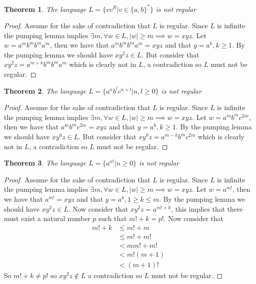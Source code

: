 \documentclass[11pt]{exam}
\newtheorem{theorem}{Theorem}[section]
\begin{document}
\begin{theorem}
The language $L = \{vv^R | v \in \{a,b\}^* \}$ is not regular
\end{theorem}

\begin{proof}
Assume for the sake of contradiction that $L$ is regular. Since $L$ is infinite the pumping lemma implies $\exists m, \forall w \in L, |w| \geq m \implies w = xyz$. Let $w = a^mb^mb^ma^m$, then we have that $a^mb^mb^ma^m = xyz$ and that $y = a^k, k \geq 1$. By the pumping lemma we should have $xy^2z \in L$. But consider that $xy^2z = a^{m+k}b^mb^ma^m$ which is clearly not in $L$, a contradiction so $L$ must not be regular.
\end{proof}


\begin{theorem}
The language $L = \{a^nb^lc^{n+l} | n,l \geq 0\}$ is not regular
\end{theorem}

\begin{proof}
Assume for the sake of contradiction that $L$ is regular. Since $L$ is infinite the pumping lemma implies $\exists m, \forall w \in L, |w| \geq m \implies w = xyz$. Let $w = a^mb^mc^{2m}$, then we have that $a^mb^mc^{2m} = xyz$ and that $y = a^k, k \geq 1$. By the pumping lemma we should have $xy^0z \in L$. But consider that $xy^0z = a^{m-k}b^mc^{2m}$ which is clearly not in $L$, a contradiction so $L$ must not be regular.
\end{proof}

\begin{theorem}
The language $L = \{a^{n!} | n \geq 0\}$ is not regular
\end{theorem}

\begin{proof}
Assume for the sake of contradiction that $L$ is regular. Since $L$ is infinite the pumping lemma implies $\exists m, \forall w \in L, |w| \geq m \implies w = xyz$. Let $w = a^{m!}$, then we have that $a^{m!} = xyz$ and that $y = a^k, 1 \geq k \leq m$. By the pumping lemma we should have $xy^2z \in L$. Now consider that $xy^2z = a^{m!+k}$, this implies that there must exist a natural number $p$ such that $m! + k = p!$. Now consider that 
\begin{align*}
m! + k &\leq m! + m\\
       &\leq m! + m!\\
       &< mm! + m!\\
       &< m!(m + 1)\\
       &< (m+1)!
\end{align*}
So $m! + k \neq p!$ so $xy^2z \notin L$ a contradiction so $L$ must not be regular.
\end{proof}
\end{document}
